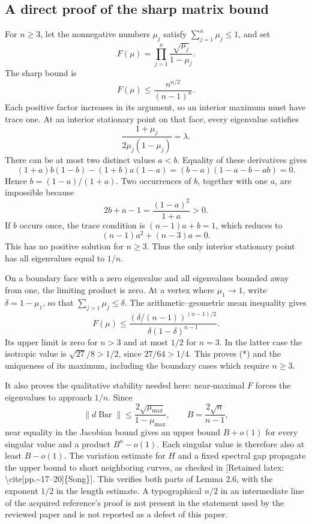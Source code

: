 \documentclass[10pt]{article}
\begin{document}
\subsection*{A direct proof of the sharp matrix bound}
For \(n\geq3\), let the nonnegative numbers \(\mu_j\) satisfy \(\sum_{j=1}^n\mu_j\leq1\), and set \[F(\mu)=\prod_{j=1}^n\frac{\sqrt{\mu_j}}{1-\mu_j}.\] The sharp bound is \[F(\mu)\leq\frac{n^{n/2}}{(n-1)^n}.
 \tag{*}\] Each positive factor increases in its argument, so an interior maximum must have trace one. At an interior stationary point on that face, every eigenvalue satisfies \[\frac{1+\mu_j}{2\mu_j(1-\mu_j)}=\lambda .\] There can be at most two distinct values \(a<b\). Equality of these derivatives gives \[(1+a)b(1-b)-(1+b)a(1-a)
       =(b-a)(1-a-b-ab)=0 .\] Hence \(b=(1-a)/(1+a)\). Two occurrences of \(b\), together with one \(a\), are impossible because \[2b+a-1=\frac{(1-a)^2}{1+a}>0.\] If \(b\) occurs once, the trace condition is \((n-1)a+b=1\), which reduces to \[(n-1)a^2+(n-3)a=0.\] This has no positive solution for \(n\geq3\). Thus the only interior stationary point has all eigenvalues equal to \(1/n\).\par
On a boundary face with a zero eigenvalue and all eigenvalues bounded away from one, the limiting product is zero. At a vertex where \(\mu_1\to1\), write \(\delta=1-\mu_1\), so that \(\sum_{j>1}\mu_j\leq\delta\). The arithmetic–geometric mean inequality gives \[F(\mu)\leq
 \frac{(\delta/(n-1))^{(n-1)/2}}
      {\delta(1-\delta)^{n-1}}.\] Its upper limit is zero for \(n>3\) and at most \(1/2\) for \(n=3\). In the latter case the isotropic value is \(\sqrt{27}/8>1/2\), since \(27/64>1/4\). This proves (*) and the uniqueness of its maximum, including the boundary cases which require \(n\geq3\).\par
It also proves the qualitative stability needed here: near-maximal \(F\) forces the eigenvalues to approach \(1/n\). Since \[\|d\operatorname{Bar}\|\leq
 \frac{2\sqrt{\mu_{\max}}}{1-\mu_{\max}},
 \qquad B=\frac{2\sqrt n}{n-1},\] near equality in the Jacobian bound gives an upper bound \(B+o(1)\) for every singular value and a product \(B^n-o(1)\). Each singular value is therefore also at least \(B-o(1)\). The variation estimate for \(H\) and a fixed spectral gap propagate the upper bound to short neighboring curves, as checked in [Retained latex: \textbackslash{}cite[pp.\textasciitilde{}17--20]\{Song\}]. This verifies both parts of Lemma 2.6, with the exponent \(1/2\) in the length estimate. A typographical \(n/2\) in an intermediate line of the acquired reference’s proof is not present in the statement used by the reviewed paper and is not reported as a defect of this paper.\par
\end{document}
